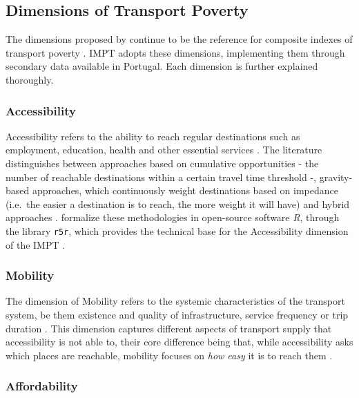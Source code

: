 \documentclass[
  authoryear,
  review,
  1p]{elsarticle}
\begin{document}
\subsection{Dimensions of Transport Poverty}\label{sec-LR_dimensions}

The dimensions proposed by \citet{Lucas_2016} continue to be the
reference for composite indexes of transport poverty
\citep{AlonsoEpelde_2023} \citep{MejiaDorantes_MurauskaiteBull_2022}.
IMPT adopts these dimensions, implementing them through secondary data
available in Portugal. Each dimension is further explained thoroughly.

\subsubsection{Accessibility}\label{sec-LR_accessibility}

Accessibility refers to the ability to reach regular destinations such
as employment, education, health and other essential services
\citep{Allen_Farber_2019} \citep{SocialExclusionUnit_2003}. The
literature distinguishes between approaches based on cumulative
opportunities - the number of reachable destinations within a certain
travel time threshold -, gravity-based approaches, which continuously
weight destinations based on impedance (i.e.~the easier a destination is
to reach, the more weight it will have) and hybrid approaches
\citep{Geurs_vanWee_2004} \citep{Klar_2023}.
\citet{Pereira_Herszenhut_2023} formalize these methodologies in
open-source software \emph{R}, through the library \texttt{r5r}, which
provides the technical base for the Accessibility dimension of the IMPT
\citep{Pereira_r5r_2021}.

\subsubsection{Mobility}\label{sec-LR_mobility}

The dimension of Mobility refers to the systemic characteristics of the
transport system, be them existence and quality of infrastructure,
service frequency or trip duration \citep{Levinson_King_2020}
\citep{Lucas_2016} \citep{MejiaDorantes_MurauskaiteBull_2022}. This
dimension captures different aspects of transport supply that
accessibility is not able to, their core difference being that, while
accessibility asks which places are reachable, mobility focuses on
\emph{how easy} it is to reach them \citep{Levinson_King_2020}.

\subsubsection{Affordability}\label{sec-LR_affordability}
\end{document}
